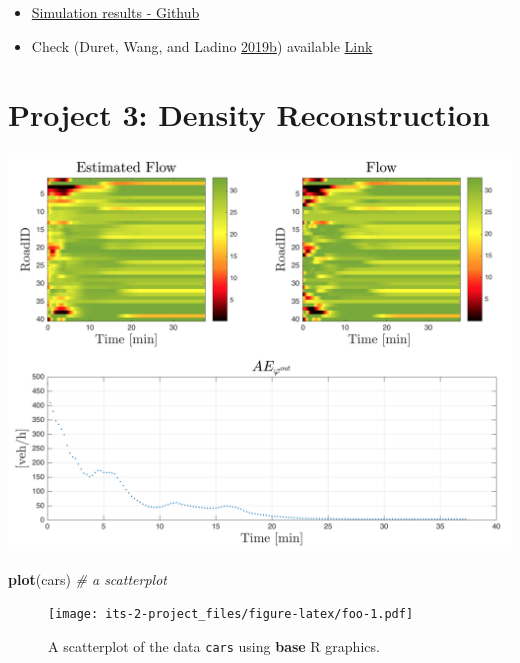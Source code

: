 \documentclass[]{book}
\newenvironment{Shaded}{\begin{snugshade}}{\end{snugshade}}
\newcommand{\CommentTok}[1]{\textcolor[rgb]{0.56,0.35,0.01}{\textit{#1}}}
\newcommand{\KeywordTok}[1]{\textcolor[rgb]{0.13,0.29,0.53}{\textbf{#1}}}
\newcommand{\NormalTok}[1]{#1}
\theoremstyle{definition}
\theoremstyle{definition}
\theoremstyle{definition}
\theoremstyle{remark}
\begin{document}
\begin{itemize}
\item
  \href{https://github.com/aladinoster/density-reconstruction}{Simulation
  results - Github}
\item
  Check (Duret, Wang, and Ladino
  \protect\hyperlink{ref-Duret2019}{2019}\protect\hyperlink{ref-Duret2019}{b})
  available \href{http://bit.ly/Hierarchical_ISTTT}{Link}
\end{itemize}

\hypertarget{project-3-density-reconstruction}{%
\chapter*{Project 3: Density
Reconstruction}\label{project-3-density-reconstruction}}

\includegraphics{images/p4-01-density.png}




\begin{Shaded}
\begin{Highlighting}[]
\KeywordTok{plot}\NormalTok{(cars)  }\CommentTok{# a scatterplot}
\end{Highlighting}
\end{Shaded}

\begin{figure}
\centering
\texttt{[image: its-2-project\_files/figure-latex/foo-1.pdf]}
\caption{\label{fig:foo}A scatterplot of the data \texttt{cars} using \textbf{base} R
graphics.}
\end{figure}
\end{document}
